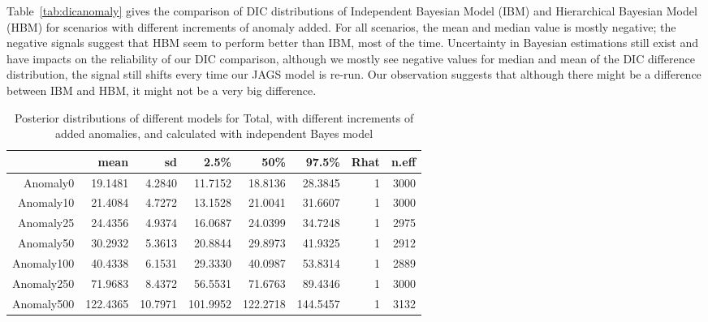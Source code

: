 Table~\ref{tab:dicanomaly} gives the comparison of DIC distributions of Independent Bayesian Model (IBM) and Hierarchical Bayesian Model (HBM) for scenarios with different increments of anomaly added. For all scenarios, the mean and median value is mostly negative; the negative signals suggest that HBM seem to perform better than IBM, most of the time. Uncertainty in Bayesian estimations still exist and have impacts on the reliability of our DIC comparison, although we mostly see negative values for median and mean of the DIC difference distribution, the signal still shifts every time our JAGS model is re-run. Our observation suggests that although there might be a difference between IBM and HBM, it might not be a very big difference.  

\begin{table}[ht]
	\centering
	\begin{tabular}{rrrrrrrr}
		\hline
		& mean & sd & 2.5\% & 50\% & 97.5\% & Rhat & n.eff \\ 
		\hline
		Anomaly0 & 19.1481 & 4.2840 & 11.7152 & 18.8136 & 28.3845 & 1 & 3000 \\ 
		Anomaly10 & 21.4084 & 4.7272 & 13.1528 & 21.0041 & 31.6607 & 1 & 3000 \\ 
		Anomaly25 & 24.4356 & 4.9374 & 16.0687 & 24.0399 & 34.7248 & 1 & 2975 \\ 
		Anomaly50 & 30.2932 & 5.3613 & 20.8844 & 29.8973 & 41.9325 & 1 & 2912 \\ 
		Anomaly100 & 40.4338 & 6.1531 & 29.3330 & 40.0987 & 53.8314 & 1 & 2889 \\ 
		Anomaly250 & 71.9683 & 8.4372 & 56.5531 & 71.6763 & 89.4346 & 1 & 3000 \\ 
		Anomaly500 & 122.4365 & 10.7971 & 101.9952 & 122.2718 & 144.5457 & 1 & 3132 \\ 
		\hline
	\end{tabular}
	\caption{Posterior distributions of different models for Total, with different increments of added anomalies, and calculated with independent Bayes model} 
	\label{tab:pstanototal}
\end{table}

